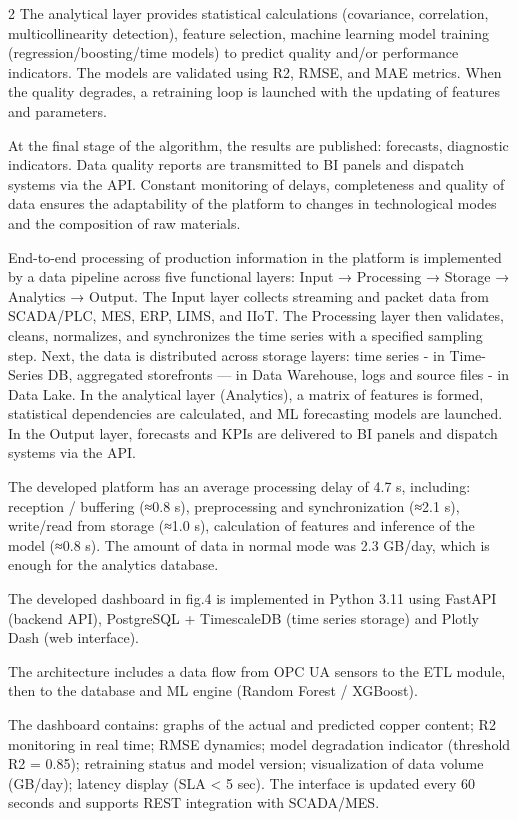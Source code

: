 \begin{multicols}{2}
The analytical layer provides statistical calculations (covariance,
correlation, multicollinearity detection), feature selection, machine
learning model training (regression/boosting/time models) to predict
quality and/or performance indicators. The models are validated using
R2, RMSE, and MAE metrics. When the quality degrades, a retraining loop
is launched with the updating of features and parameters.

At the final stage of the algorithm, the results are published:
forecasts, diagnostic indicators. Data quality reports are transmitted
to BI panels and dispatch systems via the API. Constant monitoring of
delays, completeness and quality of data ensures the adaptability of the
platform to changes in technological modes and the composition of raw
materials.

End-to-end processing of production information in the platform is
implemented by a data pipeline across five functional layers: Input →
Processing → Storage → Analytics → Output. The Input layer collects
streaming and packet data from SCADA/PLC, MES, ERP, LIMS, and IIoT. The
Processing layer then validates, cleans, normalizes, and synchronizes
the time series with a specified sampling step. Next, the data is
distributed across storage layers: time series - in Time-Series DB,
aggregated storefronts --- in Data Warehouse, logs and source files - in
Data Lake. In the analytical layer (Analytics), a matrix of features is
formed, statistical dependencies are calculated, and ML forecasting
models are launched. In the Output layer, forecasts and KPIs are
delivered to BI panels and dispatch systems via the API.

The developed platform has an average processing delay of 4.7 s,
including: reception / buffering (≈0.8 s), preprocessing and
synchronization (≈2.1 s), write/read from storage (≈1.0 s), calculation
of features and inference of the model (≈0.8 s). The amount of data in
normal mode was 2.3 GB/day, which is enough for the analytics database.

The developed dashboard in fig.4 is implemented in Python 3.11 using
FastAPI (backend API), PostgreSQL + TimescaleDB (time series storage)
and Plotly Dash (web interface).

The architecture includes a data flow from OPC UA sensors to the ETL
module, then to the database and ML engine (Random Forest / XGBoost).

The dashboard contains: graphs of the actual and predicted copper
content; R2 monitoring in real time; RMSE dynamics; model degradation
indicator (threshold R2 = 0.85); retraining status and model version;
visualization of data volume (GB/day); latency display (SLA <{}
5 sec). The interface is updated every 60 seconds and supports REST
integration with SCADA/MES.


\end{multicols}
